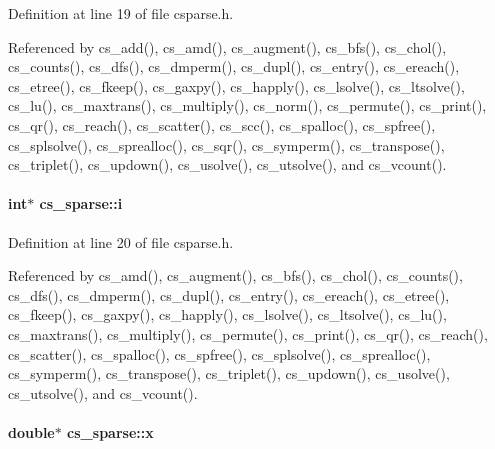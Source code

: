 Definition at line 19 of file csparse.\-h.



Referenced by cs\-\_\-add(), cs\-\_\-amd(), cs\-\_\-augment(), cs\-\_\-bfs(), cs\-\_\-chol(), cs\-\_\-counts(), cs\-\_\-dfs(), cs\-\_\-dmperm(), cs\-\_\-dupl(), cs\-\_\-entry(), cs\-\_\-ereach(), cs\-\_\-etree(), cs\-\_\-fkeep(), cs\-\_\-gaxpy(), cs\-\_\-happly(), cs\-\_\-lsolve(), cs\-\_\-ltsolve(), cs\-\_\-lu(), cs\-\_\-maxtrans(), cs\-\_\-multiply(), cs\-\_\-norm(), cs\-\_\-permute(), cs\-\_\-print(), cs\-\_\-qr(), cs\-\_\-reach(), cs\-\_\-scatter(), cs\-\_\-scc(), cs\-\_\-spalloc(), cs\-\_\-spfree(), cs\-\_\-splsolve(), cs\-\_\-sprealloc(), cs\-\_\-sqr(), cs\-\_\-symperm(), cs\-\_\-transpose(), cs\-\_\-triplet(), cs\-\_\-updown(), cs\-\_\-usolve(), cs\-\_\-utsolve(), and cs\-\_\-vcount().

\hypertarget{structcs__sparse_aeb6831b93f8a901b4a5d520c46990f44}{
\paragraph[{i}]{\setlength{\rightskip}{0pt plus 5cm}int$\ast$ cs\-\_\-sparse\-::i}}\label{structcs__sparse_aeb6831b93f8a901b4a5d520c46990f44}


Definition at line 20 of file csparse.\-h.



Referenced by cs\-\_\-amd(), cs\-\_\-augment(), cs\-\_\-bfs(), cs\-\_\-chol(), cs\-\_\-counts(), cs\-\_\-dfs(), cs\-\_\-dmperm(), cs\-\_\-dupl(), cs\-\_\-entry(), cs\-\_\-ereach(), cs\-\_\-etree(), cs\-\_\-fkeep(), cs\-\_\-gaxpy(), cs\-\_\-happly(), cs\-\_\-lsolve(), cs\-\_\-ltsolve(), cs\-\_\-lu(), cs\-\_\-maxtrans(), cs\-\_\-multiply(), cs\-\_\-permute(), cs\-\_\-print(), cs\-\_\-qr(), cs\-\_\-reach(), cs\-\_\-scatter(), cs\-\_\-spalloc(), cs\-\_\-spfree(), cs\-\_\-splsolve(), cs\-\_\-sprealloc(), cs\-\_\-symperm(), cs\-\_\-transpose(), cs\-\_\-triplet(), cs\-\_\-updown(), cs\-\_\-usolve(), cs\-\_\-utsolve(), and cs\-\_\-vcount().

\hypertarget{structcs__sparse_a0d6d06e4893a7d4d86e94ce49358d9c1}{
\paragraph[{x}]{\setlength{\rightskip}{0pt plus 5cm}double$\ast$ cs\-\_\-sparse\-::x}}\label{structcs__sparse_a0d6d06e4893a7d4d86e94ce49358d9c1}


